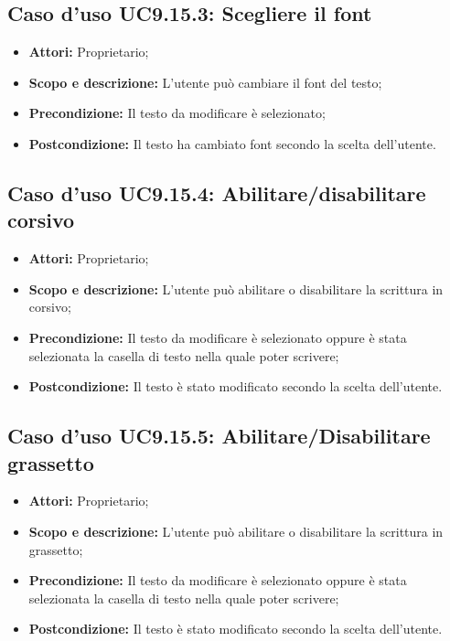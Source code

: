 \subsection{Caso d'uso UC9.15.3: Scegliere il font}
\begin{itemize}
	\item \textbf{Attori:} Proprietario;
	\item \textbf{Scopo e descrizione:} L'utente può cambiare il font del testo;
	\item \textbf{Precondizione:} Il testo da modificare è selezionato;
	\item \textbf{Postcondizione:} Il testo ha cambiato font secondo la scelta dell'utente.
\end{itemize}

\subsection{Caso d'uso UC9.15.4: Abilitare/disabilitare corsivo}
\begin{itemize}
	\item \textbf{Attori:} Proprietario;
	\item \textbf{Scopo e descrizione:} L'utente può abilitare o disabilitare la scrittura in corsivo;
	\item \textbf{Precondizione:} Il testo da modificare è selezionato oppure è stata selezionata la casella di testo nella quale poter scrivere;
	\item \textbf{Postcondizione:} Il testo è stato modificato secondo la scelta dell'utente.
\end{itemize}

\subsection{Caso d'uso UC9.15.5: Abilitare/Disabilitare grassetto}
\begin{itemize}
	\item \textbf{Attori:} Proprietario;
	\item \textbf{Scopo e descrizione:} L'utente può abilitare o disabilitare la scrittura in grassetto;
	\item \textbf{Precondizione:} Il testo da modificare è selezionato oppure è stata selezionata la casella di testo nella quale poter scrivere;
	\item \textbf{Postcondizione:} Il testo è stato modificato secondo la scelta dell'utente.
\end{itemize}

